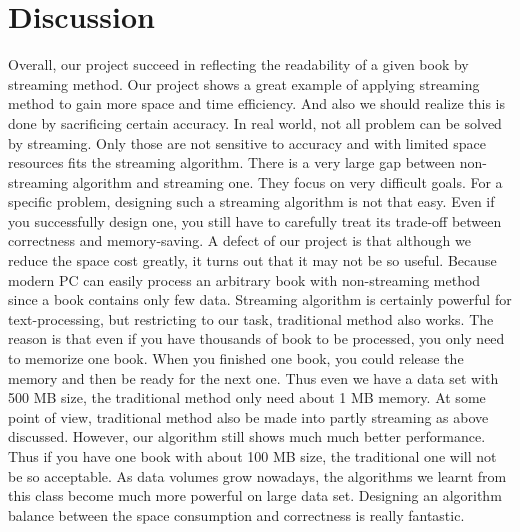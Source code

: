 \documentclass{article}
\begin{document}
\section{Discussion}
Overall, our project succeed in reflecting the readability of a given book by streaming method. Our project shows a great example of applying streaming method to gain more space and time efficiency. And also we should realize this is done by sacrificing certain accuracy.
\newline
\newline
In real world, not all problem can be solved by streaming. Only those are not sensitive to accuracy and with limited space resources fits the streaming algorithm.
There is a very large gap between non-streaming algorithm and streaming one. They focus on very difficult goals. For a specific problem, designing such a streaming algorithm is not that easy. Even if you successfully design one, you still have to carefully treat its trade-off between correctness and memory-saving.
\newline
\newline
A defect of our project is that although we reduce the space cost greatly, it turns out that it may not be so useful. Because modern PC can easily process an arbitrary book with non-streaming method since a book contains only few data.
Streaming algorithm is certainly powerful for text-processing, but restricting to our task, traditional method also works.
The reason is that even if you have thousands of book to be processed, you only need to memorize one book. When you finished one book,
you could release the memory and then be ready for the next one. Thus even we have a data set with 500 MB size,
the traditional method only need about 1 MB memory. At some point of view, traditional method also be made into partly streaming as above discussed.
However, our algorithm still shows much much better performance. Thus if you have one book with about 100 MB size,
the traditional one will not be so acceptable.
\newline
\newline
As data volumes grow nowadays, the algorithms we learnt from this class become much more powerful on large data set. Designing an algorithm
balance between the space consumption and correctness is really fantastic.

\newpage





\end{document}

